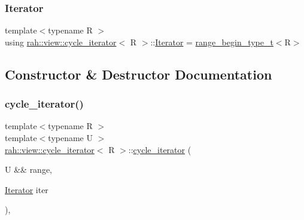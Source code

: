\mbox{\label{structrah_1_1view_1_1cycle__iterator_ac9761016862e6bb26b0ca5e923344b83}} 
\subsubsection{\texorpdfstring{Iterator}{Iterator}\hspace{0.1cm}{\footnotesize\ttfamily [2/2]}}
{\footnotesize\ttfamily template$<$typename R $>$ \\
using \mbox{\hyperlink{structrah_1_1view_1_1cycle__iterator}{rah\+::view\+::cycle\+\_\+iterator}}$<$ R $>$\+::\mbox{\hyperlink{structrah_1_1view_1_1cycle__iterator_ac9761016862e6bb26b0ca5e923344b83}{Iterator}} =  \mbox{\hyperlink{namespacerah_a28aff4eeddcece6be65ff0b956d32d4a}{range\+\_\+begin\+\_\+type\+\_\+t}}$<$R$>$}



\subsection{Constructor \& Destructor Documentation}
\mbox{\label{structrah_1_1view_1_1cycle__iterator_a69b737bdbd97194bb5cfc0470fd60e58}} 
\subsubsection{\texorpdfstring{cycle\_iterator()}{cycle\_iterator()}\hspace{0.1cm}{\footnotesize\ttfamily [1/2]}}
{\footnotesize\ttfamily template$<$typename R $>$ \\
template$<$typename U $>$ \\
\mbox{\hyperlink{structrah_1_1view_1_1cycle__iterator}{rah\+::view\+::cycle\+\_\+iterator}}$<$ R $>$\+::\mbox{\hyperlink{structrah_1_1view_1_1cycle__iterator}{cycle\+\_\+iterator}} (\begin{DoxyParamCaption}\item[{U \&\&}]{range,  }\item[{\mbox{\hyperlink{structrah_1_1view_1_1cycle__iterator_ac9761016862e6bb26b0ca5e923344b83}{Iterator}}}]{iter }\end{DoxyParamCaption})\hspace{0.3cm}{\ttfamily [inline]}, {\ttfamily [explicit]}}

